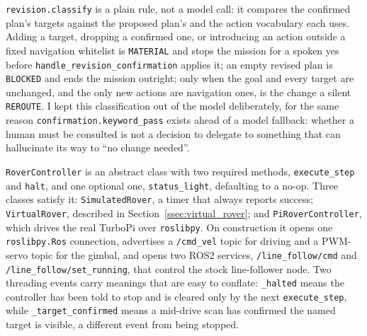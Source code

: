 \texttt{revision.classify} is a plain rule, not a model call: it compares
the confirmed plan's targets against the proposed plan's and the action
vocabulary each uses. Adding a target, dropping a confirmed one, or
introducing an action outside a fixed navigation whitelist is
\texttt{MATERIAL} and stops the mission for a spoken yes before
\texttt{handle\_revision\_confirmation} applies it; an empty revised plan is
\texttt{BLOCKED} and ends the mission outright; only when the goal and every
target are unchanged, and the only new actions are navigation ones, is the
change a silent \texttt{REROUTE}. I kept this classification out of the
model deliberately, for the same reason \texttt{confirmation.keyword\_pass}
exists ahead of a model fallback: whether a human must be consulted is not a
decision to delegate to something that can hallucinate its way to ``no
change needed''.

\label{sec:rover_client}

\label{ssec:pi_rover}

\texttt{RoverController} is an abstract class with two required methods,
\texttt{execute\_step} and \texttt{halt}, and one optional one,
\texttt{status\_light}, defaulting to a no-op. Three classes satisfy it:
\texttt{SimulatedRover}, a timer that always reports success;
\texttt{VirtualRover}, described in Section~\ref{ssec:virtual_rover}; and
\texttt{PiRoverController}, which drives the real TurboPi over
\texttt{roslibpy}. On construction it opens one \texttt{roslibpy.Ros}
connection, advertises a \texttt{/cmd\_vel} topic for driving and a
PWM-servo topic for the gimbal, and opens two ROS2 services,
\texttt{/line\_follow/cmd} and \texttt{/line\_follow/set\_running}, that
control the stock line-follower node. Two threading events carry meanings
that are easy to conflate: \texttt{\_halted} means the controller has been
told to stop and is cleared only by the next \texttt{execute\_step}, while
\texttt{\_target\_confirmed} means a mid-drive scan has confirmed the named
target is visible, a different event from being stopped.

